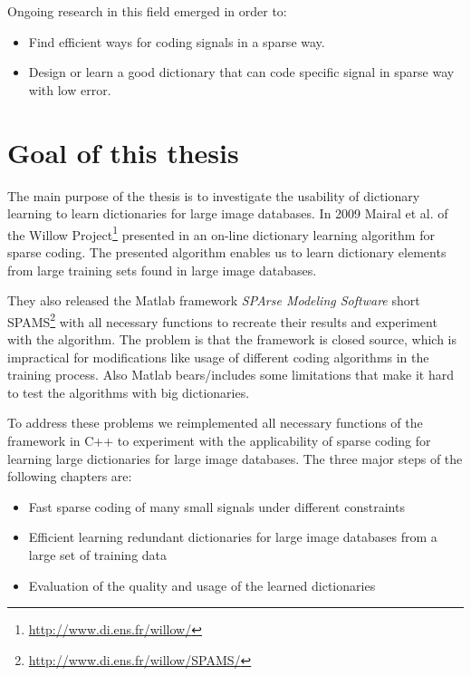 Ongoing research in this field emerged in order to:
\begin{itemize}
 \item Find efficient ways for coding signals in a sparse way.
 \item Design or learn a good dictionary that can code specific signal in sparse
way with low error.
\end{itemize}


\section{Goal of this thesis}
The main purpose of the thesis is to investigate the usability of dictionary
learning to learn dictionaries for large image databases. 
In 2009 Mairal et al. of the Willow
Project\footnote{\url{http://www.di.ens.fr/willow/}} presented in
\cite{Mairal2009,Mairal2010} an on-line dictionary learning algorithm for sparse
coding. The presented algorithm enables us to learn dictionary elements from
large training sets found in large image databases.

They also released the Matlab framework \emph{SPArse Modeling Software}
short SPAMS\footnote{\url{http://www.di.ens.fr/willow/SPAMS/}} with all
necessary functions to recreate their results and experiment with the algorithm.
The problem is that the framework is closed source, which is impractical for
modifications like usage of different coding algorithms in the training process.
Also Matlab bears/includes some limitations that make it hard to test the
algorithms with big dictionaries.

To address these problems we reimplemented all necessary functions of the
framework in C++ to experiment with the applicability of sparse coding for
learning large dictionaries for large image databases. The three major steps of
the following chapters are:

\begin{itemize}
 \item Fast sparse coding of many small signals under different constraints
 \item Efficient learning redundant dictionaries for large image databases from
a large set of training data
 \item Evaluation of the quality and usage of the learned dictionaries
\end{itemize}

